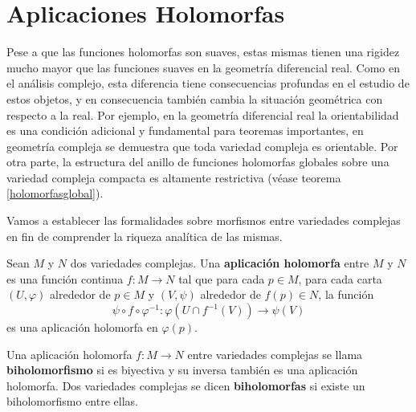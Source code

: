 \section{Aplicaciones Holomorfas}

Pese a que las funciones holomorfas son suaves, estas mismas tienen una rigidez mucho mayor que las funciones suaves en la geometría diferencial real. Como en el análisis complejo, esta diferencia tiene consecuencias profundas en el estudio de estos objetos, y en consecuencia también cambia la situación geométrica con respecto a la real. Por ejemplo, en la geometría diferencial real la orientabilidad es una condición adicional y fundamental para teoremas importantes, en geometría compleja se demuestra que toda variedad compleja es orientable. Por otra parte, la estructura del anillo de funciones holomorfas globales sobre una variedad compleja compacta es altamente restrictiva (véase teorema \ref{holomorfasglobal}).

Vamos a establecer las formalidades sobre morfismos entre variedades complejas en fin de comprender la riqueza analítica de las mismas.

\begin{definition}
	Sean $M$ y $N$ dos variedades complejas. Una \textbf{aplicación holomorfa} entre $M$ y $N$ es una función continua $f:M\to N$ tal que para cada $p\in M$, para cada carta $(U,\varphi)$ alrededor de $p\in M$ y $(V,\psi)$ alrededor de $f(p)\in N$, la función
	\begin{equation*}
		\psi\circ f\circ \varphi^{-1}:\varphi(U\cap f^{-1}(V))\longrightarrow\psi(V)
	\end{equation*}
	es una aplicación holomorfa en $\varphi(p)$.
	\begin{center}
	\end{center}
\end{definition}

\begin{definition}
	Una aplicación holomorfa $f:M\to N$ entre variedades complejas se llama \textbf{biholomorfismo} si es biyectiva y su inversa también es una aplicación holomorfa. Dos variedades complejas se dicen \textbf{biholomorfas} si existe un biholomorfismo entre ellas.
\end{definition}

